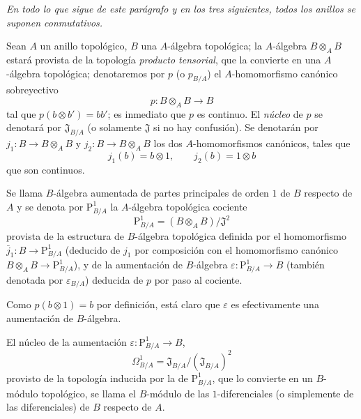 \textit{En todo lo que sigue de este parágrafo y en los tres siguientes, todos los
anillos se suponen conmutativos.}

\begin{env}[20.4.1]
\label{0.20.4.1-fr}
Sean $A$ un anillo topológico, $B$ una $A$-álgebra topológica; la
$A$-álgebra $B\otimes_A B$ estará provista de la topología \emph{producto
tensorial}, que la convierte en una $A$-álgebra topológica; denotaremos por $p$
(o $p_{B/A}$) el $A$-homomorfismo canónico sobreyectivo
\begin{equation}
\tag{20.4.1.1}
\label{0.20.4.1.1-fr}
  p:B\otimes_A B\to B
\end{equation}
tal que $p(b\otimes b')=bb'$; es inmediato que $p$ es continuo. El
\emph{núcleo} de $p$ se denotará por $\mathfrak{J}_{B/A}$ (o solamente
$\mathfrak{J}$ si no hay confusión). Se denotarán por
$j_1:B\to B\otimes_A B$ y $j_2:B\to B\otimes_A B$ los dos
$A$-homomorfismos canónicos, tales que
\[
  j_1(b)=b\otimes1, \qquad j_2(b)=1\otimes b
\]
que son continuos.
\end{env}

\begin{definition}[20.4.2]
\label{0.20.4.2-fr}
Se llama $B$-álgebra aumentada de partes principales de orden $1$ de
$B$ respecto de $A$ y se denota por $\mathrm{P}^1_{B/A}$ la $A$-álgebra
topológica cociente
\begin{equation}
\tag{20.4.2.1}
\label{0.20.4.2.1-fr}
  \mathrm{P}^1_{B/A}=(B\otimes_A B)/\mathfrak{J}^2
\end{equation}
provista de la estructura de $B$-álgebra topológica definida por el homomorfismo
$\bar{j}_1:B\to\mathrm{P}^1_{B/A}$ (deducido de $j_1$ por composición con
el homomorfismo canónico $B\otimes_A B\to\mathrm{P}^1_{B/A}$), y de
la aumentación de $B$-álgebra $\varepsilon:\mathrm{P}^1_{B/A}\to B$ (también
denotada por $\varepsilon_{B/A}$) deducida de $p$ por paso al cociente.

Como $p(b\otimes1)=b$ por definición, está claro que $\varepsilon$ es
efectivamente una aumentación de $B$-álgebra.
\end{definition}

\begin{definition}[20.4.3]
\label{0.20.4.3-fr}
El núcleo de la aumentación $\varepsilon:\mathrm{P}^1_{B/A}\to B$,
\begin{equation}
\tag{20.4.3.1}
\label{0.20.4.3.1-fr}
  \Omega^1_{B/A}=\mathfrak{J}_{B/A}/(\mathfrak{J}_{B/A})^2
\end{equation}
provisto de la topología inducida por la de $\mathrm{P}^1_{B/A}$, que lo convierte
en un $B$-módulo topológico, se llama el $B$-módulo de las
$1$-diferenciales \textup{(o simplemente de las} diferenciales) de $B$
respecto de $A$.
\end{definition}

